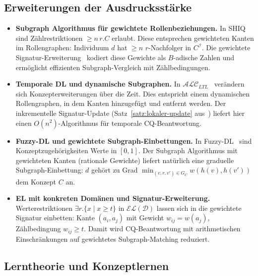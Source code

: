 ﻿\documentclass[a4paper,12pt]{article}
\theoremstyle{definition}
\theoremstyle{plain}
\theoremstyle{remark}
\newcommand{\interp}[1]{\ensuremath{\mathcal{#1}}}
\begin{document}
\subsection{Erweiterungen der Ausdrucksst{\"a}rke}

\begin{itemize}
  \item \textbf{Subgraph Algorithmus f{\"u}r gewichtete Rollenbeziehungen.}
        In \textsf{SHIQ} sind Zählrestriktionen $\geq n\,r.C$ erlaubt.
        Diese entsprechen gewichteten Kanten im Rollengraphen:
        Individuum $d$ hat $\geq n$ $r$-Nachfolger in $C^\interp{I}$.
        Die gewichtete Signatur-Erweiterung~\cite{Epp2026ext}
        kodiert diese Gewichte als $B$-adische Zahlen und
        erm{\"o}glicht effizienten Subgraph-Vergleich mit Zählbedingungen.

  \item \textbf{Temporale DL und dynamische Subgraphen.}
        In $\mathcal{ALC}_{LTL}$~\cite{Artale2001} ver{\"a}ndern sich
        Konzepterweiterungen {\"u}ber die Zeit.
        Dies entspricht einem dynamischen Rollengraphen, in dem
        Kanten hinzugef{\"u}gt und entfernt werden.
        Der inkrementelle Signatur-Update (Satz~\ref{satz:lokaler-update}
        aus~\cite{Epp2026ext}) liefert hier einen $O(n^2)$-Algorithmus
        f{\"u}r temporale CQ-Beantwortung.

  \item \textbf{Fuzzy-DL und gewichtete Subgraph-Einbettungen.}
        In Fuzzy-DL~\cite{Straccia2001} sind Konzeptzugeh{\"o}rigkeiten
        Werte in $[0,1]$.
        Der Subgraph Algorithmus mit gewichteten Kanten
        (rationale Gewichte) liefert nat{\"u}rlich eine
        graduelle Subgraph-Einbettung: $d$ geh{\"o}rt zu Grad
        $\min_{(v,r,v') \in G_C} w(h(v), h(v'))$ dem Konzept $C$ an.

  \item \textbf{EL mit konkreten Dom{\"a}nen und Signatur-Erweiterung.}
        Werterestriktionen $\exists r.\{x \mid x \geq t\}$ in
        $\mathcal{EL}(\mathcal{D})$ lassen sich in die gewichtete
        Signatur einbetten: Kante $(a_i, a_j)$ mit Gewicht $w_{ij} = w(a_j)$,
        Zählbedingung $w_{ij} \geq t$.
        Damit wird CQ-Beantwortung mit arithmetischen Einschr{\"a}nkungen
        auf gewichtetes Subgraph-Matching reduziert.
\end{itemize}

\subsection{Lerntheorie und Konzeptlernen}
\end{document}
